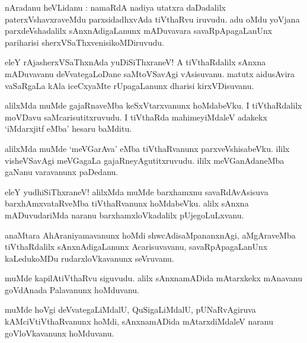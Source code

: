 \documentclass{article}
\begin{document}

\begin{mn}
nAradanu heVLidanu : namaRdA nadiya utatxra daDadalilx paterxVshavxraveMdu parxsidadhxvAda 
tiVthaRvu iruvudu. adu oMdu yoVjana parxdeVshadalilx sAnxnAdigaLanunx mADuvavara savaRpApagaLanUnx
pariharisi sherxVSaThxvenisikoMDiruvudu.
\end{mn}

\begin{mn}
eleY rAjasherxVSaThxnAda yuDiSiThxraneV! A tiVthaRdalilx sAnxna mADuvavanu deVvategaLoDane 
saMtoVSavAgi vAsisuvanu. matutx aidusAvira vaSaRgaLa kAla iceCxyaMte rUpagaLanunx dharisi 
kirxVDisuvanu.
\end{mn}

\begin{mn}
alilxMda muMde gajaRnaveMba keSxVtarxvanunx hoMdabeVku. I tiVthaRdalilx moVDavu saMcarisutitxruvudu.
I tiVthaRda mahimeyiMdaleV adakekx `iMdarxjitf eMba' hesaru baMditu.
\end{mn}

\begin{mn}
alilxMda muMde `meVGarAva' eMba tiVthaRvanunx parxveVshisabeVku. ililx visheVSavAgi meVGagaLa
gajaRneyAgutitxruvudu. ililx meVGanAdaneMba gaNanu varavanunx paDedanu.
\end{mn}

\begin{mn}
eleY yudhiSiThxraneV! alilxMda muMde barxhamxnu savaRdAvAsisuva barxhAmxvataRveMba tiVthaRvanunx 
hoMdabeVku. alilx sAnxna mADuvudariMda naranu barxhamxloVkadalilx pUjegoLuLxvanu.
\end{mn}

\begin{mn}
anaMtara AhAraniyamavanunx hoMdi shwcAdisaMpananxnAgi, aMgAraveMba tiVthaRdalilx sAnxnAdigaLanunx
Acarisuvavanu, savaRpApagaLanUnx kaLedukoMDu rudarxloVkavanunx seVruvanu.
\end{mn}

\begin{mn}
muMde kapilAtiVthaRvu siguvudu. alilx sAnxnamADida mAtarxkekx mAnavanu goVdAnada Palavanunx 
hoMduvanu.
\end{mn}

\begin{mn}
muMde hoVgi deVvategaLiMdalU, QuSigaLiMdalU, pUNaRvAgiruva kAMciVtiVthaRvanunx hoMdi, sAnxnamADida
mAtarxdiMdaleV naranu goVloVkavanunx hoMduvanu.
\end{mn}
\end{document}
